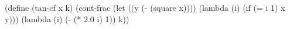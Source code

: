 \begtt\scm 
(define (tan-cf x k)
  (cont-frac (let ((y (- (square x))))
               (lambda (i) (if (= i 1) x y)))
             (lambda (i) (- (* 2.0 i) 1))
             k))
\endtt
